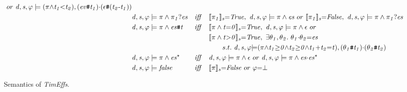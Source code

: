 \documentclass[acmsmall,10pt,review]{acmart}
\newcommand{\es}{\theta}
\newcommand{\ev}{ev}
\newcommand{\timedEffects}{\emph{TimEffs}}
\newcommand{\code}[1]{{\tt{\ensuremath{\m{#1}}}}}
\newcommand{\empt}{\textcolor{black}{\ensuremath{\epsilon}}}
\newcommand{\bott}{\textcolor{black}{\ensuremath{\bot}}}
\newcommand{\m}{\mathit}
\newcommand{\mysharp}{{\mathrel{\texttt{\#}}}}
\begin{document}
{\begin{figure}[]
\begin{align*}
\ or\ \code{d, s, \varphi \models {(\pi{\wedge}t_1 {<}t_2)}  , (\ev\mysharp t_1){\cdot}(\epsilon \mysharp  (t_2\text{-}t_1))  } \\
&\code{d, s, \varphi \models {\pi} \wedge \pi_1 ? es}  &\m{iff}\quad & 
\code{\llbracket \pi_1  \rrbracket_{s} {=}  
 {True} }, \ \code{d, s, \varphi \models {\pi}  \wedge es}\ or  \ 
  \code{\llbracket \pi_1 \rrbracket_{s} {=}  
{False} }, 
\  \code{d, s, \varphi \models {\pi} \wedge \pi_1 ? es}\\
&\code{d, s, \varphi \models {\pi}  \wedge es\mysharp  t}  &\m{iff}\quad &
 \code{\llbracket {\pi}  \wedge t {=} 0 \rrbracket_{s} {=}  
 {True} }, \ \code{d, s, \varphi \models {\pi}  \wedge \empt}\ or  \\
& & &  \code{\llbracket {\pi}\wedge t {>} 0 \rrbracket_{s} {=}  
{True} }, 
\  \exists \code{\es_1,\es_2}. \  \code{\es_1 {\cdot} \es_2 {=} es}\\
&&& \qquad  s.t. \ \code{d, s, \varphi {\models} {(\pi 
{\wedge} t_1{\geq}0{\wedge}t_2{\geq}0 {\wedge} t_1{+} t_2{=}t)}  , 
(\es_1\mysharp t_1) {\cdot} (\es_2\mysharp t_2) } \\
&\code{d, s, \varphi \models {\pi}\wedge es^\star}  &\m{iff}\quad & 
\code{d, s, \varphi \models {\pi}  \wedge \empt}\ or \ 
\code{d, s, \varphi \models {\pi}  \wedge es {\cdot} es^\star}\\
& \code{d, s, \varphi \models false}  &\m{iff}\quad &
 \code{\llbracket {\pi}  \rrbracket_{s} {=} {False} } \ or \ \code{\varphi {=} \bott}
\end{align*}
  \vspace{-2mm}
\caption{Semantics of \timedEffects.}
\label{fig:Sementic}
\vspace{-2mm}
\end{figure}




}
\end{document}
